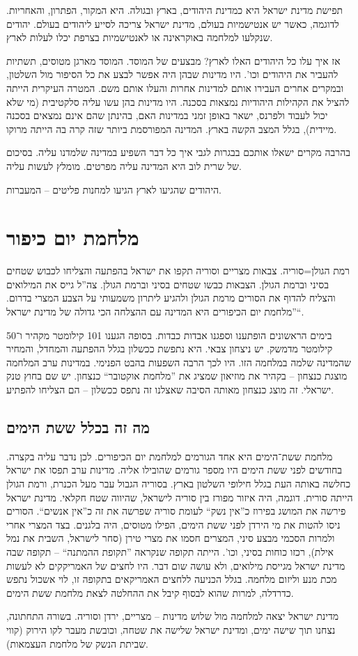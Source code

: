 \documentclass[]{../../../../tex/classes/styledArticle}
\begin{document}
	תפישת מדינת ישראל היא כמדינת היהודים, בארץ ובגולה. היא המקור, הפתרון, והאחריות. לדוגמה, כאשר יש אנטישמיות בעולם, מדינת ישראל צריכה לסייע ליהודים בעולם. יהודים שנקלעו למלחמה באוקראינה או לאנטישמיות בצרפת יכלו לעלות לארץ. 
	
	אז איך עלו כל היהודים האלו לארץ? מבצעים של המוסד. המוסד מארגן מטוסים, תשתיות להעביר את היהודים וכו'. היו מדינות שבהן היה אפשר לבצע את כל הסיפור מול השלטון, ובמקרים אחרים העבירו אותם למדינות אחרות והעלו אותם משם. המטרה העיקרית הייתה להציל את הקהילות היהודיות נמצאות בסכנה. היו מדינות בהן עשו עליה סלקטיבית (מי שלא יכול לעבוד ולפרנס, ישאר באופן זמני במדינות האם, בהינתן שהם אינם נמצאים בסכנה מיידית), בגלל המצב הקשה בארץ. המדינה המפורסמת ביותר שזה קרה בה הייתה מרוקו. 
	
	בהרבה מקרים ישאלו אותכם בבגרות לגבי איך כל דבר השפיע במדינה שלמדנו עליה. בסיכום של שרית לוב היא המדינה עליה מפרטים. מומלץ לעשות עליה. 
	
	היהודים שהגיעו לארץ הגיעו למחנות פליטים – המעברות. 
	
	\section*{מלחמת יום כיפור}
	רמת הגולן=סוריה. צבאות מצריים וסוריה תקפו את ישראל בהפתעה והצליחו לכבוש שטחים בסיני וברמת הגולן. הצבאות כבשו שטחים בסיני וברמת הגולן. צה''ל גייס את המילואים והצליח להדוף את הסורים מרמת הגולן ולהגיע ליתרון משמעותי על הצבע המצרי בדרום. ''מלחמת יום הכיפורים היא המדינה עם ההצלחה הכי גדולה של מדינת ישראל``. 
	
	בימים הראשונים הופתענו וספגנו אבדות כבדות. בסופה הגענו 101 קילומטר מקהיר ו־50 קילומטר מדמשק. יש ניצחון צבאי. היא נתפשת ככשלון בגלל ההפתעה והמחדל, והמחיר שהמדינה שלמה במלחמה הזו. היו לכך הרבה השפעות בהבט הפנימי. במדינות ערב המלחמה מוצגת כנצחון – בקהיר את מוזיאון שמציג את ''מלחמת אוקטובר`` כנצחון. יש שם בחוץ טנק ישראלי. זה מוצג כנצחון מאותה הסיבה שאצלנו זה נתפס ככשלון – הם הצליחו להפתיע. 
	\subsection*{מה זה בכלל ששת הימים}
	מלחמת ששת־הימים היא אחד הגורמים למלחמת יום הכיפורים. לכן נדבר עליה בקצרה. בחודשים לפני ששת הימים היו מספר גורמים שהובילו אליה. מדינות ערב תפסו את ישראל כחלשה באותה העת בגלל חילופי השלטון בארץ. בסוריה הגבול עבר מעל הכנרת, ורמת הגולן הייתה סורית. דוגמה, היה איזור מפורז בין סוריה לישראל, שהיווה שטח חקלאי. מדינת ישראל פירשה את המושג בפירוז כ''אין נשק`` לעומת סוריה שפרשה את זה כ''אין אנשים``. הסורים ניסו להטות את מי הירדן לפני ששת הימים, הפילו מטוסים, היה בלגנים. בצד המצרי אחרי ולמרות הסכמי מבצע סיני, המצרים חסמו את מצרי טירן (סחר לישראל, השבית את נמל אילת), רכזו כוחות בסיני, וכו'. הייתה תקופה שנקראה ''תקופת ההמתנה`` – תקופה שבה מדינת ישראל מגייסת מילואים, ולא עושה שום דבר. היו לחצים של האמריקקים לא לעשות מכת מנע וליזום מלחמה. בגלל הכניעה ללחצים האמריקאים בתקופה זו, לוי אשכול נתפש כדרדלה, למרות שהוא לבסוף קיבל את ההחלטה לצאת מלחמת ששת הימים. 
	
	מדינת ישראל יצאה למלחמה מול שלוש מדינות – מצריים, ירדן וסוריה. בשורה התחתונה, נצחנו תוך שישה ימים, ומדינת ישראל שלישה את שטחה, וכובשת מעבר לקו הירוק (קווי שביתת הנשק של מלחמת העצמאות). 
	
	
	\ndoc
	
\end{document}
